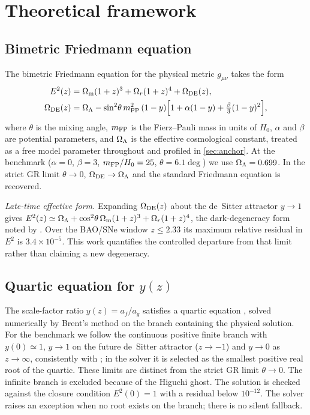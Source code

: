 \section{Theoretical framework}\label{sec:theory}

\subsection{Bimetric Friedmann equation}
The bimetric Friedmann equation for the physical metric $g_{\mu\nu}$ takes the form
\begin{equation}
\begin{aligned}
E^2(z)&=\Omega_{\mathrm m}(1+z)^3+\Omega_{r}(1+z)^4+\Omega_{\mathrm{DE}}(z),\\
\Omega_{\mathrm{DE}}(z)&=\Omega_{\Lambda}-\sin^2\!\theta\,m_{\mathrm{FP}}^2\,(1-y)\Bigl[1+\alpha(1-y)+\tfrac{\beta}{3}(1-y)^2\Bigr],
\end{aligned}
\label{eq:friedmann}
\end{equation}
where $\theta$ is the mixing angle, $m_{\mathrm{FP}}$ is the Fierz--Pauli mass in units of $H_0$, $\alpha$ and $\beta$ are potential parameters, and $\Omega_{\Lambda}$ is the effective cosmological constant, treated as a free model parameter throughout and profiled in \cref{sec:anchor}. At the benchmark ($\alpha=0$, $\beta=3$, $m_{\mathrm{FP}}/H_0=25$, $\theta=6.1\deg$) we use $\Omega_{\Lambda}=0.699$. In the strict GR limit $\theta\to0$, $\Omega_{\mathrm{DE}}\to\Omega_{\Lambda}$ and the standard Friedmann equation is recovered.

\emph{Late-time effective form.} Expanding $\Omega_{\mathrm{DE}}(z)$ about the de~Sitter attractor $y\to1$ gives $E^2(z)\simeq\Omega_{\Lambda}+\cos^2\!\theta\,\Omega_{\mathrm m}(1+z)^3+\Omega_{r}(1+z)^4$, the dark-degeneracy form noted by \citet{Hogas2021}. Over the BAO/SNe window $z\le2.33$ its maximum relative residual in $E^2$ is $3.4\times10^{-5}$. This work quantifies the controlled departure from that limit rather than claiming a new degeneracy.

\subsection[Quartic equation for y(z)]{Quartic equation for $y(z)$}
The scale-factor ratio $y(z)=a_f/a_g$ satisfies a quartic equation \citep[][Eq.~5.5, equivalent to the appendix of \citealp{Hogas2025}]{Hogas2021}, solved numerically by Brent's method on the branch containing the physical solution. For the benchmark we follow the continuous positive finite branch with $y(0)\simeq1$, $y\to1$ on the future de~Sitter attractor ($z\to-1$) and $y\to0$ as $z\to\infty$, consistently with \citet[][Sec.~5.2]{Hogas2021}; in the solver it is selected as the smallest positive real root of the quartic. These limits are distinct from the strict GR limit $\theta\to0$. The infinite branch is excluded because of the Higuchi ghost. The solution is checked against the closure condition $E^2(0)=1$ with a residual below $10^{-12}$. The solver raises an exception when no root exists on the branch; there is no silent fallback.

